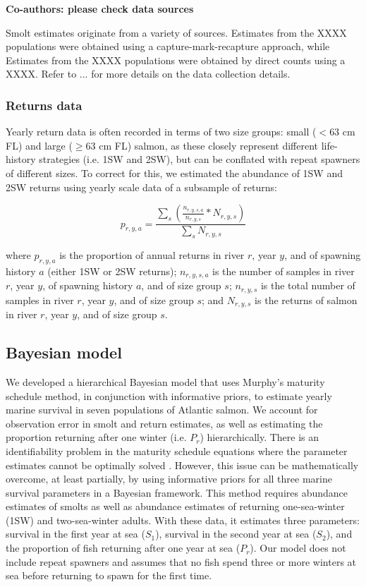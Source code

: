 \documentclass[12pt]{article}
\newcommand{\So}{$S_{1}$\xspace}
\newcommand{\St}{$S_{2}$\xspace}
\newcommand{\Pg}{$P_r$\xspace}
\newcommand{\comment}[1]{\par {\bfseries \color{blue} #1 \par}} %
\begin{document}
\comment{Co-authors: please check data sources}

Smolt estimates originate from a variety of sources.
Estimates from the XXXX populations were obtained using a capture-mark-recapture approach, while
Estimates from the XXXX populations were obtained by direct counts using a XXXX.
Refer to ... for more details on the data collection details. 

\subsubsection*{Returns data}

Yearly return data is often recorded in terms of two size groups: small ($< 63$ cm
FL) and large ($\geq 63$ cm FL) salmon, as these closely represent different
life-history strategies (i.e. 1SW and 2SW), but can be conflated with repeat
spawners of different sizes. To correct for this, we estimated the abundance
of 1SW and 2SW returns using yearly scale data of a subsample of returns:

\begin{equation}
    p_{r,y,a} = \frac{\sum_{s}{(\frac{n_{r,y,s,a}}{n_{r,y,s}} * N_{r,y,s})}}{\sum_{s}{N_{r,y,s}}}
\end{equation}

where $p_{r,y,a}$ is the proportion of annual returns in river $r$, year $y$,
and of spawning history $a$ (either 1SW or 2SW returns); $n_{r,y,s,a}$ is the
number of samples in river $r$, year $y$, of spawning history $a$, and of size
group $s$; $n_{r,y,s}$ is the total number of samples in river $r$, year $y$,
and of size group $s$; and $N_{r,y,s}$ is the returns of salmon
in river $r$, year $y$, and of size group $s$.

\subsection*{Bayesian model}

We developed a hierarchical Bayesian model that uses Murphy's maturity
schedule method, in conjunction with informative priors, to estimate yearly
marine survival in seven populations of Atlantic salmon. We account for
observation error in smolt and return estimates, as well as estimating the
proportion returning after one winter (i.e. \Pg) hierarchically.
There is an identifiability problem in the maturity schedule equations where
the parameter estimates cannot be optimally solved \citep{Chaput2003a}.
However, this issue can be mathematically overcome, at least partially, by
using informative priors for all three marine survival parameters in a
Bayesian framework.
This method requires abundance estimates of smolts as well as abundance estimates
of returning one-sea-winter (1SW) and two-sea-winter adults. With these data,
it estimates three parameters: survival in the first year at sea (\So), survival
in the second year at sea (\St), and the proportion of fish returning after one
year at sea (\Pg). 
Our model does not include repeat spawners and assumes that no fish spend
three or more winters at sea before returning to spawn for the first time.
\end{document}

